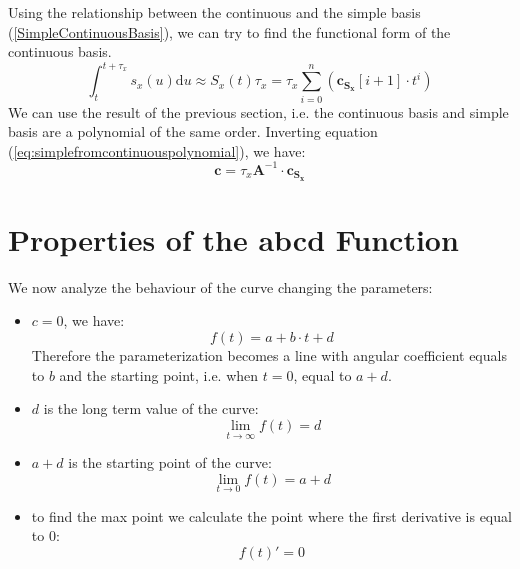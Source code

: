\documentclass{article}
\begin{document}
\begin{appendices}
Using the relationship between the continuous and the simple basis (\ref{SimpleContinuousBasis}), we can try to find the functional form of the continuous basis.
\begin{equation}
\int_t^{t+\tau_x} s_x(u) \mathrm{d}u \approx S_x(t) \tau_x= \tau_x \sum_{i=0}^{n}(\mathbf{c_{S_x}}[i+1] \cdot t^i) 
\end{equation}
We can use the result of the previous section, i.e. the continuous basis and simple basis are a polynomial of the same order. Inverting equation (\ref{eq:simplefromcontinuouspolynomial}), we have:
\begin{equation}
\mathbf{c} = \tau_x \mathbf{A}^{-1} \cdot \mathbf{c_{S_x}}
\end{equation}

\section{Properties of the abcd Function}



We now analyze the behaviour of the curve changing the parameters:

\begin{itemize}
\item \textbf{$c=0$}, we have:
\begin{equation}
f(t) = a + b\cdot t + d
\end{equation}
Therefore the parameterization becomes a line with angular coefficient equals to $b$ and the starting point, i.e. when $t=0$, equal to $a+d$.

\item $d$ is the long term value of the curve:
\begin{equation}
\lim_{t\rightarrow \infty} f(t)=d
\end{equation}

\item $a+d$ is the starting point of the curve:
\begin{equation}
\lim_{t\rightarrow 0} f(t)=a+d
\end{equation}

\item to find the max point we calculate the point where the first derivative is equal to $0$:
\begin{equation}
f(t)' = 0
\end{equation}


\end{itemize}
\end{appendices}
\end{document}
